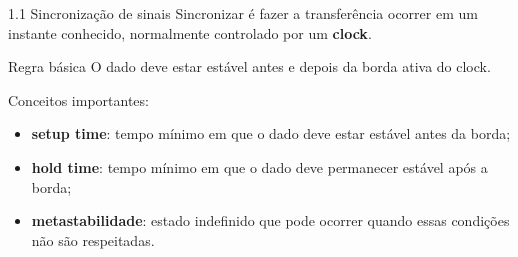 \begin{frame}{1.1 Sincronização de sinais}
  Sincronizar é fazer a transferência ocorrer em um instante conhecido, normalmente controlado por um \textbf{clock}.
  \begin{block}{Regra básica}
    O dado deve estar estável antes e depois da borda ativa do clock.
  \end{block}
  Conceitos importantes:
  \begin{itemize}
    \item \textbf{setup time}: tempo mínimo em que o dado deve estar estável antes da borda;
    \item \textbf{hold time}: tempo mínimo em que o dado deve permanecer estável após a borda;
    \item \textbf{metastabilidade}: estado indefinido que pode ocorrer quando essas condições não são respeitadas.
  \end{itemize}
\end{frame}